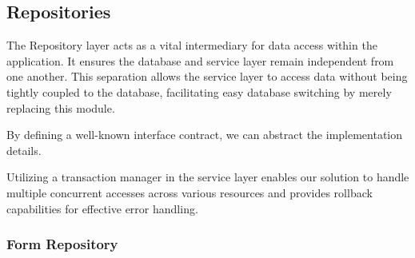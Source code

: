 %
%
\newpage
\subsection{Repositories}

The Repository layer acts as a vital intermediary for data access within the application. It ensures the database and service layer remain independent from one another. This separation allows the service layer to access data without being tightly coupled to the database, facilitating easy database switching by merely replacing this module.

By defining a well-known interface contract, we can abstract the implementation details.

Utilizing a transaction manager in the service layer enables our solution to handle multiple concurrent accesses across various resources and provides rollback capabilities for effective error handling.


\subsubsection{Form Repository}

